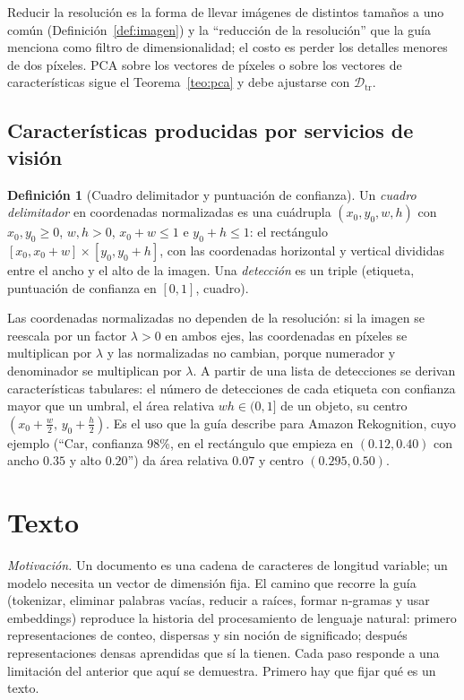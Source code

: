 \documentclass[11pt]{article}
\theoremstyle{definition}
\newtheorem{definicion}[teorema]{Definición}
\theoremstyle{remark}
\newcommand{\Dtr}{\mathcal{D}_{\mathrm{tr}}}
\begin{document}
\noindent Reducir la resolución es la forma de llevar imágenes de distintos tamaños a uno común (Definición~\ref{def:imagen}) y la ``reducción de la resolución'' que la guía menciona como filtro de dimensionalidad; el costo es perder los detalles menores de dos píxeles. PCA sobre los vectores de píxeles o sobre los vectores de características sigue el Teorema~\ref{teo:pca} y debe ajustarse con $\Dtr$.

\subsection{Características producidas por servicios de visión}\label{sec:bbox}

\begin{definicion}[Cuadro delimitador y puntuación de confianza]\label{def:bbox}
\noindent Un \emph{cuadro delimitador} en coordenadas normalizadas es una cuádrupla $(x_0,y_0,w,h)$ con $x_0,y_0\ge0$, $w,h>0$, $x_0+w\le1$ e $y_0+h\le1$: el rectángulo $[x_0,x_0+w]\times[y_0,y_0+h]$, con las coordenadas horizontal y vertical divididas entre el ancho y el alto de la imagen. Una \emph{detección} es un triple (etiqueta, puntuación de confianza en $[0,1]$, cuadro).
\end{definicion}

\noindent Las coordenadas normalizadas no dependen de la resolución: si la imagen se reescala por un factor $\lambda>0$ en ambos ejes, las coordenadas en píxeles se multiplican por $\lambda$ y las normalizadas no cambian, porque numerador y denominador se multiplican por $\lambda$. A partir de una lista de detecciones se derivan características tabulares: el número de detecciones de cada etiqueta con confianza mayor que un umbral, el área relativa $wh\in(0,1]$ de un objeto, su centro $(x_0+\frac w2,\,y_0+\frac h2)$. Es el uso que la guía describe para Amazon Rekognition, cuyo ejemplo (``Car, confianza 98\%, en el rectángulo que empieza en $(0.12,0.40)$ con ancho $0.35$ y alto $0.20$'') da área relativa $0.07$ y centro $(0.295,0.50)$.

\section{Texto}\label{sec:texto}

\noindent \emph{Motivación.} Un documento es una cadena de caracteres de longitud variable; un modelo necesita un vector de dimensión fija. El camino que recorre la guía (tokenizar, eliminar palabras vacías, reducir a raíces, formar n-gramas y usar embeddings) reproduce la historia del procesamiento de lenguaje natural: primero representaciones de conteo, dispersas y sin noción de significado; después representaciones densas aprendidas que sí la tienen. Cada paso responde a una limitación del anterior que aquí se demuestra. Primero hay que fijar qué es un texto.
\end{document}
